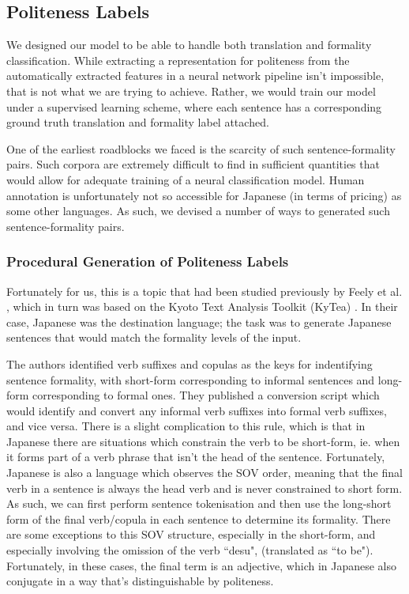 \documentclass[11pt]{article}
\begin{document}
\subsection{Politeness Labels}

We designed our model to be able to handle both translation and formality classification. While extracting a representation for politeness from the automatically extracted features in a neural network pipeline isn't impossible, that is not what we are trying to achieve. Rather, we would train our model under a supervised learning scheme, where each sentence has a corresponding ground truth translation and formality label attached.

One of the earliest roadblocks we faced is the scarcity of such sentence-formality pairs. Such corpora are extremely difficult to find in sufficient quantities that would allow for adequate training of a neural classification model. Human annotation is unfortunately not so accessible for Japanese (in terms of pricing) as some other languages. As such, we devised a number of ways to generated such sentence-formality pairs.

\subsubsection{Procedural Generation of Politeness Labels}

Fortunately for us, this is a topic that had been studied previously by Feely et al. \cite{Feely:19}, which in turn was based on the Kyoto Text Analysis Toolkit (KyTea) \cite{Neubig:11}. In their case, Japanese was the destination language; the task was to generate Japanese sentences that would match the formality levels of the input. 

The authors identified verb suffixes and copulas as the keys for indentifying sentence formality, with short-form corresponding to informal sentences and long-form corresponding to formal ones. They published a conversion script which would identify and convert any informal verb suffixes into formal verb suffixes, and vice versa. There is a slight complication to this rule, which is that in Japanese there are situations which constrain the verb to be short-form, ie. when it forms part of a verb phrase that isn't the head of the sentence. Fortunately, Japanese is also a language which observes the SOV order, meaning that the final verb in a sentence is always the head verb and is never constrained to short form. As such, we can first perform sentence tokenisation and then use the long-short form of the final verb/copula in each sentence to determine its formality. There are some exceptions to this SOV structure, especially in the short-form, and especially involving the omission of the verb ``desu", (translated as ``to be"). Fortunately, in these cases, the final term is an adjective, which in Japanese also conjugate in a way that's distinguishable by politeness. 
\end{document}
